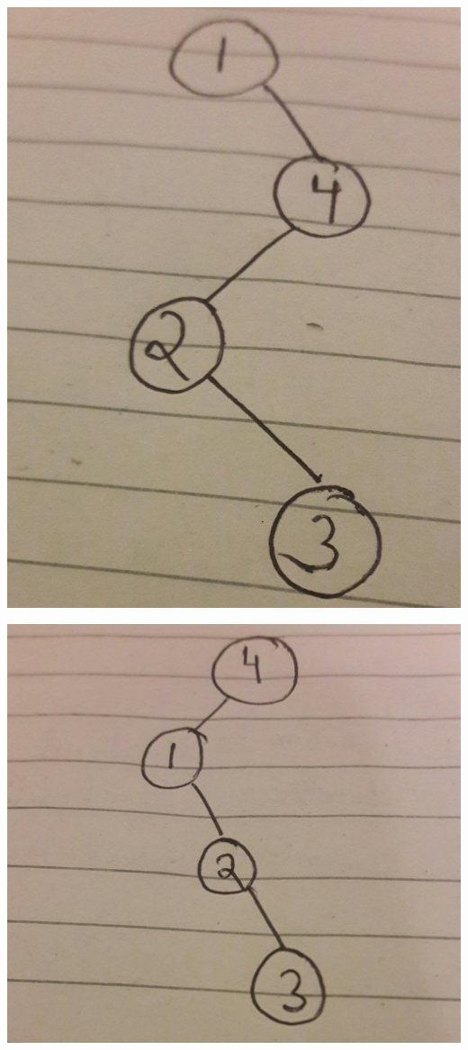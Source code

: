 \documentclass{article}
\begin{document}
\includegraphics[scale=0.05]{3.jpg}






\includegraphics[scale=0.05]{4.jpg}
\end{document}
